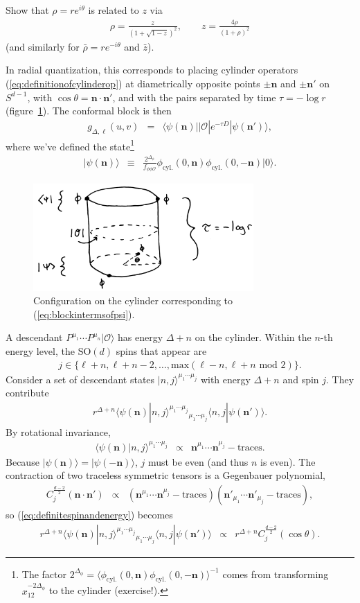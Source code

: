 \documentclass[12pt]{article}
\numberwithin{equation}{section}
\newcommand\be{\begin{eqnarray}}
\newcommand\ee{\end{eqnarray}}
\newcommand\f\phi
\newcommand\cO{\mathcal{O}}
\newcommand\<\langle
\renewcommand\>\rangle
\renewcommand\.{\cdot}
\newcommand\SO{\mathrm{SO}}
\newcommand\De{\Delta}
\newcommand\bn{\mathbf{n}}
\renewcommand\th{\theta}
\begin{document}
Show that $\rho=re^{i\theta}$ is related to $z$ via
\be
\label{eq:radialcoordinatedefinition}
\rho = \frac{z}{(1+\sqrt{1-z})^2},\qquad z = \frac{4\rho}{(1+\rho)^2}
\ee
(and similarly for $\bar\rho=r e^{-i\theta}$ and $\bar z$).

In radial quantization, this corresponds to placing cylinder operators (\ref{eq:definitionofcylinderop}) at diametrically opposite points $\pm \bn$ and $\pm \bn'$ on $S^{d-1}$, with $\cos\th=\bn\.\bn'$, and with the pairs separated by time $\tau=-\log r$ (figure~\ref{fig:cylinderconfig}).  The conformal block is then
\be
\label{eq:blockintermsofpsi}
 g_{\De,\ell}(u,v) &=& \<\psi(\bn)||\cO|e^{-\tau D}|\psi(\bn')\>,
\ee
where we've defined the state\footnote{The factor $2^{\De_\f}=\<\f_\mathrm{cyl.}(0,\bn)\f_\mathrm{cyl.}(0,-\bn)\>^{-1}$ comes from transforming $x_{12}^{-2\De_\f}$ to the cylinder (exercise!).}
\be
|\psi(\bn)\> &\equiv& \frac{2^{\De_\f}}{f_{\f\f\cO}}\phi_\mathrm{cyl.}(0,\bn)\phi_\mathrm{cyl.}(0,-\bn)|0\>.
\ee


\begin{figure}
\begin{center}
\includegraphics[width=0.75\textwidth]{cylinderconfig.jpg}
\end{center}
\caption{Configuration on the cylinder corresponding to (\ref{eq:blockintermsofpsi}).  \label{fig:cylinderconfig}}
\end{figure}

A descendant $P^{\mu_1}\cdots P^{\mu_n}|\cO\>$ has energy $\De+n$ on the cylinder.  Within the $n$-th energy level, the $\SO(d)$ spins that appear are
\be
\label{eq:rangeofjs}
j \in \{\ell+n,\ell+n-2,\dots,\mathrm{max}(\ell-n,\ell+n\,\,\mathrm{mod}\,\,2)\}.
\ee
Consider a set of descendant states $|n,j\>^{\mu_1\cdots\mu_j}$ with energy $\De+n$ and spin $j$. They contribute
\be
r^{\De+n} \<\psi(\bn)|n,j\>^{\mu_1\cdots\mu_j}{}_{\mu_1\cdots\mu_j}\<n,j|\psi(\bn')\>.
\label{eq:definitespinandenergy}
\ee
By rotational invariance,
\be
\<\psi(\bn)|n,j\>^{\mu_1\cdots\mu_j} &\propto& \bn^{\mu_1}\cdots\bn^{\mu_j}-\mathrm{traces}.
\ee
Because $|\psi(\bn)\>=|\psi(-\bn)\>$, $j$ must be even (and thus $n$ is even).
The contraction of two traceless symmetric tensors is a Gegenbauer polynomial,
\be
C_j^{\frac{d-2}{2}}(\bn\cdot\bn') &\propto& (\bn^{\mu_1}\cdots\bn^{\mu_j}-\mathrm{traces})(\bn'_{\mu_1}\cdots\bn'_{\mu_j}-\mathrm{traces}),
\ee
so (\ref{eq:definitespinandenergy}) becomes
\be
r^{\De+n} \<\psi(\bn)|n,j\>^{\mu_1\cdots\mu_j}{}_{\mu_1\cdots\mu_j}\<n,j|\psi(\bn')\> &\propto& r^{\De+n}C_j^{\frac{d-2}{2}}(\cos\th).
\ee
\end{document}
